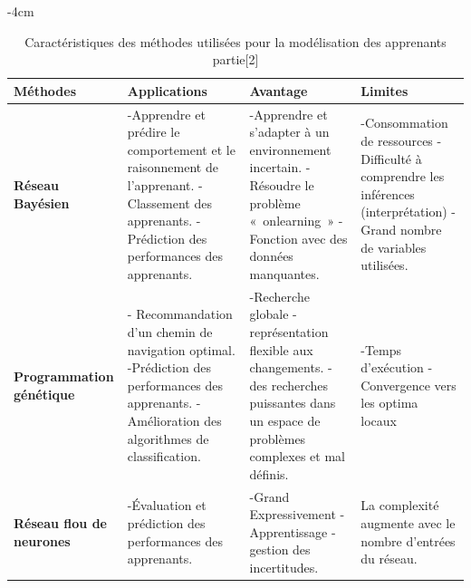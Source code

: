 \begin{table}[H]
	\centering
	\addtolength{\leftskip} {-4cm}
	\addtolength{\rightskip}{-4.5cm}
	\begin{tabular}{|m{3cm}|m{5cm}|m{5cm}|m{4cm}|}
	\hline
	\rowcolor{blueforest}
	\color{white} \textbf{Méthodes} & \color{white} \textbf{Applications} & \color{white} \textbf{Avantage} & \color{white} \textbf{Limites} \\
	\hline\hline
	  \textbf{Réseau Bayésien}  &
	  -Apprendre et prédire le comportement et le raisonnement de l'apprenant. \newline
	  -Classement des apprenants. \newline
	  -Prédiction des performances des apprenants.&
	  -Apprendre et s'adapter à un environnement incertain.\newline
	  -Résoudre le problème « onlearning » \newline
	  -Fonction avec des données manquantes.&
	  -Consommation de ressources \newline
	  -Difficulté à comprendre les inférences (interprétation) \newline
	  -Grand nombre de variables utilisées. \\ \hline
	  \textbf{Programmation génétique}  &
	  - Recommandation d'un chemin de navigation optimal. \newline
	  -Prédiction des performances des apprenants. \newline
	  -Amélioration des algorithmes de classification.&
	  -Recherche globale \newline
	  -représentation flexible aux changements. \newline
	  -des recherches puissantes dans un espace de problèmes complexes et mal définis.&
	  -Temps d'exécution \newline
	  -Convergence vers les optima locaux \\ \hline
	  \textbf{Réseau flou de neurones}  &
	  -Évaluation et prédiction des performances des apprenants.&
	  -Grand Expressivement \newline
	  -Apprentissage \newline
	  -gestion des incertitudes.&
	  La complexité augmente avec le nombre d'entrées du réseau. \\ \hline
	\end{tabular}
	\caption{Caractéristiques des méthodes utilisées pour la modélisation des apprenants partie[2]}
	\label{Caracteristiques_modelisation_apprenants2}
\end{table}

